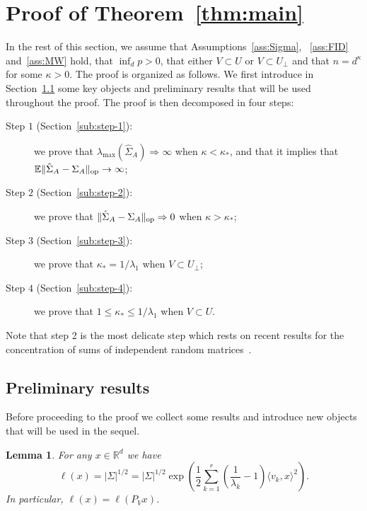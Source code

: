 \documentclass[]{article}
\newcommand{\E}{\mathbb{E}}
\newcommand{\R}{\mathbb{R}}
\newcommand{\op}{{\rm op}}
\theoremstyle{plain}
\newtheorem{lemma}{Lemma}[section]
\theoremstyle{definition}
\begin{document}
\section{Proof of Theorem~\ref{thm:main}} \label{sec:proofs}

In the rest of this section, we assume that Assumptions~\ref{ass:Sigma}, ~\ref{ass:FID} and~\ref{ass:MW} hold, that $\inf_d p > 0$, that either $V \subset U$ or $V \subset U_\perp$ and that $n = d^\kappa$ for some $\kappa > 0$. The proof is organized as follows. We first introduce in Section~\ref{sub:preliminary} some key objects and preliminary results that will be used throughout the proof. The proof is then decomposed in four steps:
\begin{description}
	\item[Step $1$ (Section~\ref{sub:step-1}):] we prove that $\lambda_{\max}(\hat \Sigma_A) \Rightarrow \infty$ when $\kappa < \kappa_*$, and that it implies that $\E \lVert \hat \Sigma_A - \Sigma_A \rVert_\op \to \infty$;
	\item[Step $2$ (Section~\ref{sub:step-2}):] we prove that $\lVert \hat \Sigma_A - \Sigma_A \rVert_\op \Rightarrow 0$ when $\kappa > \kappa_*$;
	\item[Step $3$ (Section~\ref{sub:step-3}):] we prove that $\kappa_* = 1/\lambda_1$ when $V \subset U_\perp$;
	\item[Step $4$ (Section~\ref{sub:step-4}):] we prove that $1 \leq \kappa_* \leq 1/\lambda_1$ when $V \subset U$.
\end{description}

Note that step 2 is the most delicate step which rests on recent results for the concentration of sums of independent random matrices~\cite{Brailovskaya24-0}.



\subsection{Preliminary results} \label{sub:preliminary}

Before proceeding to the proof we collect some results and introduce new objects that will be used in the sequel.

\begin{lemma}\label{lemma:ell}
	For any $x \in \R^d$ we have
	\begin{equation} \label{eq:expression-ell}
		\ell(x) = \lvert \Sigma \rvert^{1/2} = \lvert \Sigma \rvert^{1/2} \exp \left( \frac{1}{2} \sum_{k=1}^r \left( \frac{1}{\lambda_k} - 1 \right) \langle v_k, x \rangle^2 \right).
	\end{equation}
	In particular, $\ell(x) = \ell(P_V x)$.
\end{lemma}
\end{document}
